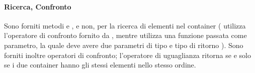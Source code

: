 \paragraph{Ricerca, Confronto} %
\label{par:ricerca_confronto}
Sono forniti metodi  e ,  e non, per la ricerca di elementi nel container ( utilizza l'operatore di confronto fornito da , mentre  utilizza una funzione passata come parametro, la quale deve avere due parametri di tipo  e tipo di ritorno ). Sono forniti inoltre operatori di confronto; l'operatore di uguaglianza ritorna  se e solo se i due container hanno gli stessi elementi nello stesso ordine.
